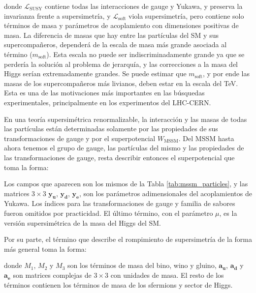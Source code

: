donde $\mathcal{L}_{\text{SUSY}}$ contiene todas las interacciones de gauge y Yukawa, y preserva la invarianza frente a supersimetría, y $\mathcal{L}_{\text{soft}}$ viola supersimetría, pero contiene solo términos de masa y parámetros de acoplamiento con dimensiones positivas de masa. La diferencia de masas que hay entre las partículas del SM y sus supercompañeros, dependerá de la escala de masa más grande asociada al término  ($m_{\text{soft}}$). Esta escala no puede ser indiscriminadamente grande ya que se perdería la solución al problema de jerarquía, y  las correcciones a la masa del Higgs serían extremadamente grandes. Se puede estimar 
que $m_{\text{soft}}$, y por ende las masas de los supercompañeros más livianos, deben estar en la escala del TeV. Esta es una de las motivaciones más importantes en las búsquedas experimentales, principalmente en los experimentos del LHC-CERN.



En una teoría supersimétrica renormalizable, la interacción y las masas de todas las partículas están determinadas solamente por las propiedades de sus transformaciones de gauge y por el superpotencial $W_{\text{MSSM}}$. 
Del MSSM hasta ahora tenemos el grupo de gauge, las partículas del mismo y las propiedades de las transformaciones de gauge, resta describir entonces el superpotencial que toma la forma:


Los campos que aparecen son los mismos de la Tabla \ref{tab:mssm_particles}, y las matrices $3\times3$ $\textbf{y}_\textbf{u}$, $\textbf{y}_\textbf{d}$, $\textbf{y}_\textbf{e}$, son los parámetros adimensionales del acoplamientos de Yukawa. Los índices para las transformaciones de gauge y familia de sabores fueron omitidos por practicidad. El último término, con el parámetro $\mu$, es la versión supersimétrica de la masa del Higgs del SM.

Por su parte, el término que describe el rompimiento de supersimetría de la forma más general toma la forma:



donde $M_1$, $M_2$ y $M_3$ son los términos de masa del bino, wino y gluino, $\textbf{a}_\textbf{u}$, $\textbf{a}_\textbf{d}$ y $\textbf{a}_\textbf{e}$ son matrices complejas de $3\times3$ con unidades de masa.
El resto de los términos contienen los términos de masa de los sfermions y sector de Higgs.






